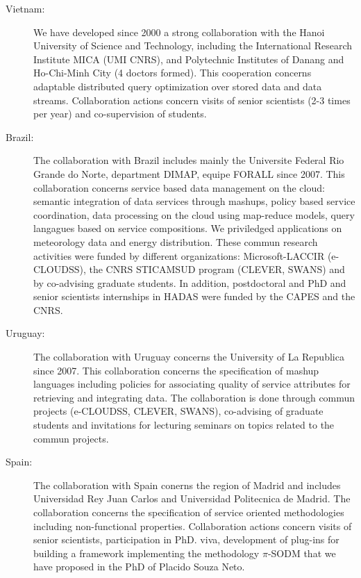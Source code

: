 \begin{description}


\item[Vietnam:] We have developed since 2000 a strong collaboration with the Hanoi University of Science and Technology, including the International Research Institute MICA (UMI CNRS), and Polytechnic Institutes of Danang and Ho-Chi-Minh City (4 doctors formed). This cooperation concerns adaptable distributed query optimization over stored data and data streams. Collaboration actions concern visits of senior scientists (2-3 times per year) and co-supervision of students.

\item[Brazil:] 

The collaboration with Brazil includes mainly
the Universite Federal Rio Grande do Norte, department DIMAP,  equipe FORALL since 2007. This collaboration concerns service based data management on the cloud: semantic integration of data services through mashups, policy based service coordination, data processing on the cloud using map-reduce models, query langagues based on service compositions.  We priviledged applications on meteorology data and energy distribution. These commun research activities were funded by different organizations: 
Microsoft-LACCIR (e-CLOUDSS), the CNRS STICAMSUD program (CLEVER, SWANS) and by co-advising graduate students. In addition, postdoctoral and PhD and senior scientists internships in HADAS were funded by the CAPES and the CNRS.   

\item[Uruguay:] 

The collaboration with Uruguay concerns the University of La Republica since 2007. This collaboration concerns the specification of mashup languages including policies for associating quality of service attributes for retrieving and integrating data. The collaboration is done through commun projects (e-CLOUDSS, CLEVER, SWANS), co-advising of graduate students and invitations for lecturing seminars on topics related to the commun projects.

\item[Spain:] 

The collaboration with Spain conerns the region of Madrid and includes Universidad Rey Juan Carlos and Universidad Politecnica de Madrid. The collaboration concerns the specification of service oriented methodologies including non-functional properties. Collaboration actions concern visits of senior scientists, participation in PhD. viva, development of plug-ins for building a framework implementing the methodology $\pi$-SODM that we have proposed in the PhD of Placido Souza Neto. 



\end{description}


